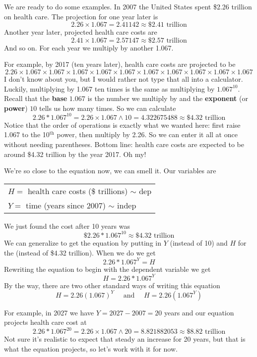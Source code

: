 We are ready to do some examples.  In 2007 the United States spent \$2.26 trillion on health care.  The projection for one year later is
$$2.26 \times 1.067 = 2.41142 \approx \$2.41 \text{ trillion}$$  
Another year later, projected health care costs are
$$2.41  \times 1.067 = 2.57147 \approx \$2.57 \text{ trillion}$$  
And so on.  For each year we multiply by another 1.067.  

For example, by 2017 (ten years later), health care costs are projected to be
$$2.26 \times 1.067  \times 1.067  \times 1.067  \times 1.067  \times 1.067  \times 1.067  \times 1.067  \times 1.067  \times 1.067  \times 1.067 $$
I don't know about you, but I would rather not type that all into a calculator.  Luckily, multiplying by 1.067 ten times is the same as multiplying by $1.067^{10}$.  Recall that the  \textbf{base} $1.067$ is the number we multiply by and the \textbf{exponent} (or \textbf{power}) $10$ tells us how many times.  So we can calculate 
$$2.26  \ast 1.067^{10} = 2.26 \times 1.067 \wedge 10  
= 4.322675488 \approx \$ 4.32 \text{ trillion}$$ 
Notice that the order of operations is exactly what we wanted here:  first raise 1.067 to the 10$^{\text{th}}$ power, then multiply by 2.26.  So we can enter it all at once without needing parentheses.
Bottom line: health care costs are expected to be around \$4.32 trillion by the year 2017.  Oh my! 

We're so close to the equation now, we can smell it.   Our variables are 
\begin{center}
\begin{tabular} {l} 
$H=$ health care costs (\$ trillions) $\sim$ dep \\
$Y= $ time (years since 2007) $\sim$ indep \\ 
\end{tabular}
\end{center}We just found the cost after 10 years was 
$$\text{\$2.26}  \ast 1.067^{10}\approx \$4.32 \text{ trillion}$$  
We can generalize to get the equation by putting in $Y$  (instead of 10) and $H$ for the (instead of \$4.32 trillion).  When we do we get
$$2.26  \ast 1.067^{Y} = H$$ 
Rewriting the equation to begin with the dependent variable we get 
$$H = 2.26\ast 1.067^{Y}$$  
By the way, there are two other standard ways of writing this equation  
$$ H= 2.26(1.067)^{Y} \quad \text{ and } \quad H = 2.26\left(1.067^{Y}\right)$$

For example, in 2027 we have $Y=2027 - 2007 = 20$ years and our equation projects health care cost at 
$$2.26 \ast 1.067^{20} = 2.26 \times 1.067 \wedge 20 = 8.821882053 \approx \$8.82 \text{ trillion}$$
Not sure it's realistic to expect that steady an increase for 20 years, but that is what the equation projects, so let's work with it for now.

